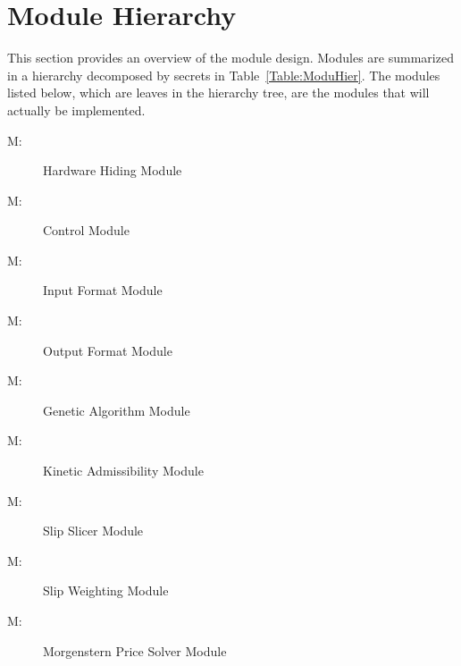 \documentclass[12pt]{article}
\newcounter{modnum}
\newcommand{\mthemodnum}{M\themodnum}
\begin{document}
\section{Module Hierarchy}
\label{Sec:ModuHier}
This section provides an overview of the module design. Modules are summarized in a hierarchy decomposed by secrets in Table~\ref{Table:ModuHier}. The modules listed below, which are leaves in the hierarchy tree, are the modules that will actually be implemented.
\begin{description}
\item[\mthemodnum\label{M:hwHiding}:]Hardware Hiding Module
\end{description}
\begin{description}
\item[\mthemodnum\label{M:modControl}:]Control Module
\end{description}
\begin{description}
\item[\mthemodnum\label{M:modinputfdesc}:]Input Format Module
\end{description}
\begin{description}
\item[\mthemodnum\label{M:modoutputfdesc}:]Output Format Module
\end{description}
\begin{description}
\item[\mthemodnum\label{M:modgenalgdesc}:]Genetic Algorithm Module
\end{description}
\begin{description}
\item[\mthemodnum\label{M:modkinadmdesc}:]Kinetic Admissibility Module
\end{description}
\begin{description}
\item[\mthemodnum\label{M:modslipslicerdesc}:]Slip Slicer Module
\end{description}
\begin{description}
\item[\mthemodnum\label{M:modslipweightdesc}:]Slip Weighting Module
\end{description}
\begin{description}
\item[\mthemodnum\label{M:modmpdesc}:]Morgenstern Price Solver Module
\end{description}
\end{document}

